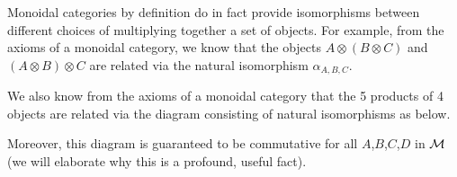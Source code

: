 Monoidal categories by definition do in fact provide isomorphisms 
between different choices of multiplying together 
a set of objects. For example, from the axioms of a monoidal category, we know
that the objects $A\otimes(B\otimes C)$ and $(A \otimes B) \otimes C$ 
are related via the natural isomorphism $\alpha_{A,B,C}$.
\begin{center}
\end{center}

We also know from the axioms of a monoidal category that 
the 5 products of 4 objects are related via the diagram consisting 
of natural isomorphisms as below.
\begin{center}
\end{center}
Moreover, this diagram is guaranteed to be commutative for all $A$,$B$,$C$,$D$ in $\mathcal{M}$ (we 
will elaborate why this is a profound, useful fact).

